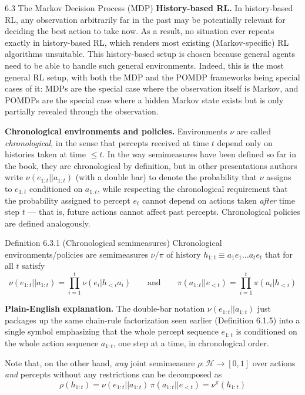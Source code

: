 \documentclass[aspectratio=169,10pt]{beamer}
\newcommand{\Hcal}{\mathcal{H}}
\begin{document}
\begin{frame}[allowframebreaks]{6.3 The Markov Decision Process (MDP)}
\vspace{0.2cm}
\textbf{History-based RL.} In history-based RL, any observation arbitrarily
far in the past may be potentially relevant for deciding the best action to
take now. As a result, no situation ever repeats exactly in history-based
RL, which renders most existing (Markov-specific) RL algorithms unsuitable.
This history-based setup is chosen because general agents need to be able
to handle such general environments. Indeed, this is the most general RL
setup, with both the MDP and the POMDP frameworks being special cases of
it: MDPs are the special case where the observation itself is Markov, and
POMDPs are the special case where a hidden Markov state exists but is only
partially revealed through the observation.

\framebreak

\textbf{Chronological environments and policies.} Environments $\nu$ are
called \emph{chronological}, in the sense that percepts received at time
$t$ depend only on histories taken at time $\le t$. In the way semimeasures
have been defined so far in the book, they are chronological by definition,
but in other presentations authors write $\nu(e_{1:t}||a_{1:t})$ (with a
double bar) to denote the probability that $\nu$ assigns to $e_{1:t}$
conditioned on $a_{1:t}$, while respecting the chronological requirement
that the probability assigned to percept $e_t$ cannot depend on actions
taken \emph{after} time step $t$ --- that is, future actions cannot affect
past percepts. Chronological policies are defined analogously.

\begin{block}{Definition 6.3.1 (Chronological semimeasures)}
Chronological environments/policies are semimeasures $\nu/\pi$ of history
$h_{1:t} \equiv a_1e_1 \ldots a_te_t$ that for all $t$ satisfy
\[
  \nu(e_{1:t}||a_{1:t}) = \prod_{i=1}^{t}\nu(e_i|h_{<i}a_i)
  \qquad\text{and}\qquad
  \pi(a_{1:t}||e_{<t}) = \prod_{i=1}^{t}\pi(a_i|h_{<i})
\]
\end{block}

\textbf{Plain-English explanation.} The double-bar notation
$\nu(e_{1:t}||a_{1:t})$ just packages up the same chain-rule factorization
seen earlier (Definition 6.1.5) into a single symbol emphasizing that the
whole percept sequence $e_{1:t}$ is conditioned on the whole action
sequence $a_{1:t}$, one step at a time, in chronological order.

\framebreak

Note that, on the other hand, \emph{any} joint semimeasure $\rho: \Hcal \to
[0,1]$ over actions \emph{and} percepts without any restrictions can be
decomposed as
\[
  \rho(h_{1:t}) = \nu(e_{1:t}||a_{1:t})\,\pi(a_{1:t}||e_{<t}) = \nu^\pi(h_{1:t})
  \tag{6.3.2}
\]


\end{frame}
\end{document}

